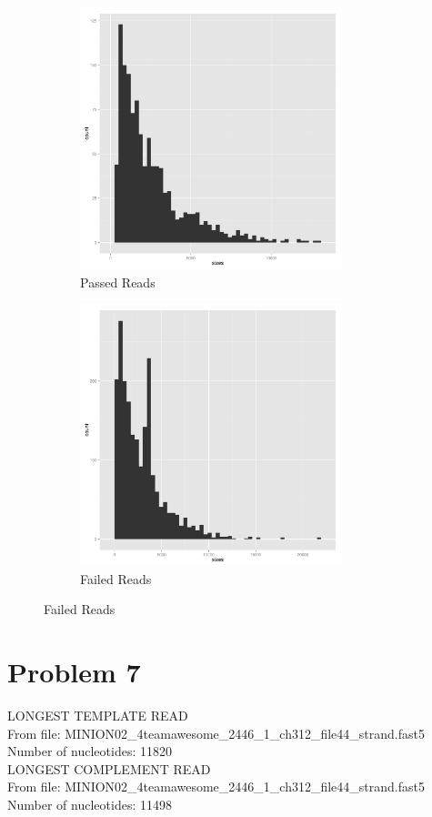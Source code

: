 \documentclass[11pt]{article}
\begin{document}
        \begin{figure}[h!]
		\begin{subfigure}[b]{0.45\textwidth}
    			\includegraphics[width=3in]{histallpass}
    			\caption{Passed Reads}
  		\end{subfigure}
  		\begin{subfigure}[b]{0.45\textwidth}
    			\includegraphics[width=3in]{histallfail}
    			\caption{Failed Reads}
  		\end{subfigure}
	\end{figure}
\section*{Problem 7}

LONGEST TEMPLATE READ\\
From file: MINION02\_4teamawesome\_2446\_1\_ch312\_file44\_strand.fast5\\
Number of nucleotides: 11820\\

LONGEST COMPLEMENT READ\\
From file: MINION02\_4teamawesome\_2446\_1\_ch312\_file44\_strand.fast5\\
Number of nucleotides: 11498\\
\end{document}
